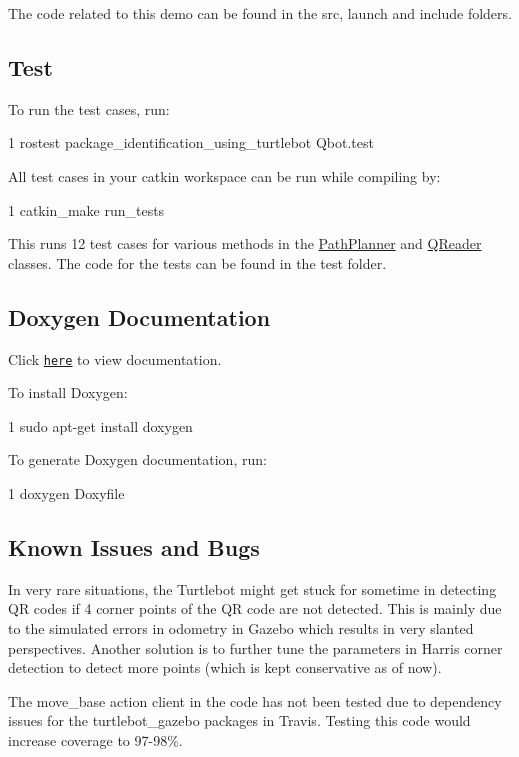  

The code related to this demo can be found in the src, launch and include folders.

\subsection*{Test}

To run the test cases, run\+: 
\begin{DoxyCode}
1 rostest package\_identification\_using\_turtlebot Qbot.test
\end{DoxyCode}


All test cases in your catkin workspace can be run while compiling by\+: 
\begin{DoxyCode}
1 catkin\_make run\_tests
\end{DoxyCode}


This runs 12 test cases for various methods in the \hyperlink{classPathPlanner}{Path\+Planner} and \hyperlink{classQReader}{Q\+Reader} classes. The code for the tests can be found in the test folder.

\subsection*{Doxygen Documentation}

Click \href{https://mayavan.github.io/package_identification_using_turtlebot/}{\tt here} to view documentation.

To install Doxygen\+: 
\begin{DoxyCode}
1 sudo apt-get install doxygen
\end{DoxyCode}
 To generate Doxygen documentation, run\+: 
\begin{DoxyCode}
1 doxygen Doxyfile
\end{DoxyCode}


\subsection*{Known Issues and Bugs}


\begin{DoxyItemize}
\item In very rare situations, the Turtlebot might get stuck for sometime in detecting QR codes if 4 corner points of the QR code are not detected. This is mainly due to the simulated errors in odometry in Gazebo which results in very slanted perspectives. Another solution is to further tune the parameters in Harris corner detection to detect more points (which is kept conservative as of now).
\item The move\+\_\+base action client in the code has not been tested due to dependency issues for the turtlebot\+\_\+gazebo packages in Travis. Testing this code would increase coverage to 97-\/98\%.
\end{DoxyItemize}

